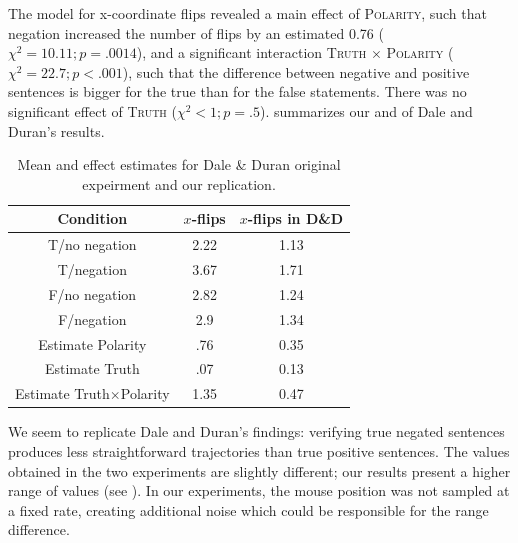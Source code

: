 \documentclass{article}
\begin{document}
The model for x-coordinate flips revealed a main effect of \textsc{Polarity}, such that negation increased the number of flips by an estimated 0.76 ($\chi^{2}=10.11; p=.0014$), and a significant interaction \textsc{Truth} $\times$ \textsc{Polarity} ($\chi^{2}=22.7; p<.001$), such that the difference between negative and positive sentences is bigger for the true than for the false statements. There was no significant effect of \textsc{Truth} ($\chi^{2}<1; p=.5$). 
 summarizes our and of Dale and Duran's results. 

\begin{table}[h]
\begin{center}
\begin{tabular}{ccc}
Condition & $x$-flips &  $x$-flips in D\&D \\
\hline
T/no negation & 2.22 & 1.13 \\
T/negation & 3.67 & 1.71 \\
F/no negation & 2.82 & 1.24 \\
F/negation & 2.9 & 1.34 \\
Estimate Polarity & .76 & 0.35 \\
Estimate Truth & .07 & 0.13 \\
Estimate Truth$\times$Polarity & 1.35 & 0.47\\
\end{tabular}
\caption{Mean and effect estimates for Dale \& Duran original expeirment and our replication.}
\label{table:negationresults}
\end{center}
\end{table}%

We seem to replicate Dale and Duran's findings: verifying true negated sentences produces less straightforward trajectories than true positive sentences. The values obtained in the two experiments are slightly different; our results present a higher range of values (see ). 
In our experiments, the mouse position was not sampled at a fixed rate, creating additional noise which could be responsible for the range difference. 

\end{document}
